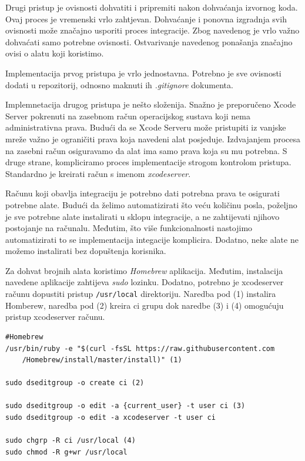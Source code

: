 \documentclass[times, utf8, diplomski, numeric]{fer}
\begin{document}
\begin{appendices}
Drugi pristup je ovisnosti dohvatiti i pripremiti nakon dohvaćanja izvornog koda. Ovaj proces je vremenski vrlo zahtjevan. Dohvaćanje i ponovna izgradnja svih ovisnosti može značajno usporiti proces integracije. Zbog navedenog je vrlo važno dohvaćati samo potrebne ovisnosti. Ostvarivanje navedenog ponašanja značajno ovisi o alatu koji koristimo.

Implementacija prvog pristupa je vrlo jednostavna. Potrebno je sve ovisnosti dodati u repozitorij, odnosno maknuti ih \textit{.gitignore} dokumenta.

Implemnetacija drugog pristupa je nešto složenija. Snažno je preporučeno Xcode Server pokrenuti na zasebnom račun operacijskog sustava koji nema administrativna prava. Budući da se Xcode Serveru može pristupiti iz vanjske mreže važno je ograničiti prava koja navedeni alat posjeduje. Izdvajanjem procesa na zasebni račun osiguravamo da alat ima samo prava koja su mu potrebna. S druge strane, kompliciramo proces implementacije strogom kontrolom pristupa. Standardno je kreirati račun s imenom \textit{xcodeserver}.

Računu koji obavlja integraciju je potrebno dati potrebna prava te osigurati potrebne alate. Budući da želimo automatizirati što veću količinu posla, poželjno je sve potrebne alate instalirati u sklopu integracije, a ne zahtijevati njihovo postojanje na računalu. Međutim, što više funkcionalnosti nastojimo automatizirati to se implementacija integacije komplicira. Dodatno, neke alate ne možemo instalirati bez dopuštenja korisnika.

Za dohvat brojnih alata koristimo \textit{Homebrew} aplikacija. Međutim, instalacija navedene aplikacije zahtijeva \textit{sudo} lozinku. Dodatno, potrebno je xcodeserver računu dopustiti pristup \verb|/usr/local| direktoriju. Naredba pod (1) instalira Homberew, naredba pod (2) kreira ci grupu dok naredbe (3) i (4) omogućuju pristup xcodeserver računu.

\begin{verbatim}
#Homebrew
/usr/bin/ruby -e "$(curl -fsSL https://raw.githubusercontent.com
    /Homebrew/install/master/install)" (1)

sudo dseditgroup -o create ci (2)

sudo dseditgroup -o edit -a {current_user} -t user ci (3)
sudo dseditgroup -o edit -a xcodeserver -t user ci

sudo chgrp -R ci /usr/local (4)
sudo chmod -R g+wr /usr/local

\end{verbatim}


\end{appendices}
\end{document}
